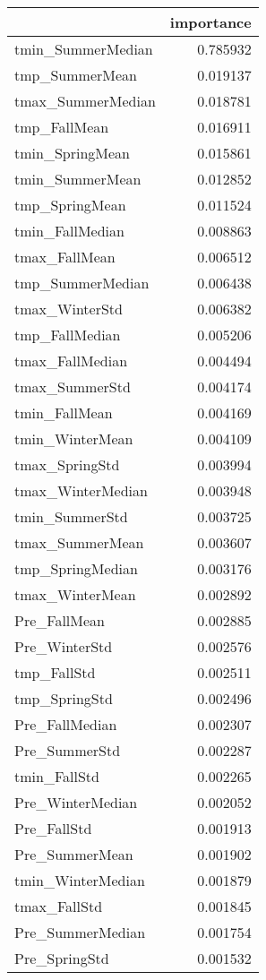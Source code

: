 \begin{tabular}{lr}
\toprule
 & importance \\
\midrule
tmin_SummerMedian & 0.785932 \\
tmp_SummerMean & 0.019137 \\
tmax_SummerMedian & 0.018781 \\
tmp_FallMean & 0.016911 \\
tmin_SpringMean & 0.015861 \\
tmin_SummerMean & 0.012852 \\
tmp_SpringMean & 0.011524 \\
tmin_FallMedian & 0.008863 \\
tmax_FallMean & 0.006512 \\
tmp_SummerMedian & 0.006438 \\
tmax_WinterStd & 0.006382 \\
tmp_FallMedian & 0.005206 \\
tmax_FallMedian & 0.004494 \\
tmax_SummerStd & 0.004174 \\
tmin_FallMean & 0.004169 \\
tmin_WinterMean & 0.004109 \\
tmax_SpringStd & 0.003994 \\
tmax_WinterMedian & 0.003948 \\
tmin_SummerStd & 0.003725 \\
tmax_SummerMean & 0.003607 \\
tmp_SpringMedian & 0.003176 \\
tmax_WinterMean & 0.002892 \\
Pre_FallMean & 0.002885 \\
Pre_WinterStd & 0.002576 \\
tmp_FallStd & 0.002511 \\
tmp_SpringStd & 0.002496 \\
Pre_FallMedian & 0.002307 \\
Pre_SummerStd & 0.002287 \\
tmin_FallStd & 0.002265 \\
Pre_WinterMedian & 0.002052 \\
Pre_FallStd & 0.001913 \\
Pre_SummerMean & 0.001902 \\
tmin_WinterMedian & 0.001879 \\
tmax_FallStd & 0.001845 \\
Pre_SummerMedian & 0.001754 \\
Pre_SpringStd & 0.001532 \\

\end{tabular}
